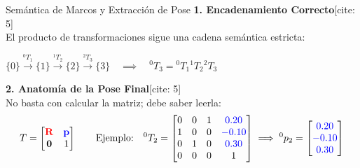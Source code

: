\documentclass[aspectratio=169, table, xcdraw]{beamer}
\begin{document}
\begin{frame}{Semántica de Marcos y Extracción de Pose}
    \textbf{1. Encadenamiento Correcto}[cite: 5] \\
    El producto de transformaciones sigue una cadena semántica estricta:
    \begin{center}
        $\{0\} \xrightarrow{{}^0T_1} \{1\} \xrightarrow{{}^1T_2} \{2\} \xrightarrow{{}^2T_3} \{3\} \quad \implies \quad {}^0T_3 = {}^0T_1 {}^1T_2 {}^2T_3$
    \end{center}
    
    \vspace{0.4cm}
    \textbf{2. Anatomía de la Pose Final}[cite: 5] \\
    No basta con calcular la matriz; debe saber leerla:
    \begin{equation*}
        T = 
        \begin{bmatrix}
        \color{red}\mathbf{R} & \color{blue}\mathbf{p} \\
        \mathbf{0} & 1
        \end{bmatrix}
        \qquad \text{Ejemplo:} \quad
        {}^0T_2 = \begin{bmatrix} 0&0&1&\color{blue}0.20 \\ 1&0&0&\color{blue}-0.10 \\ 0&1&0&\color{blue}0.30 \\ 0&0&0&1 \end{bmatrix} \implies {}^0p_2 = \begin{bmatrix} \color{blue}0.20 \\ \color{blue}-0.10 \\ \color{blue}0.30 \end{bmatrix}
    \end{equation*}
\end{frame}
\end{document}
